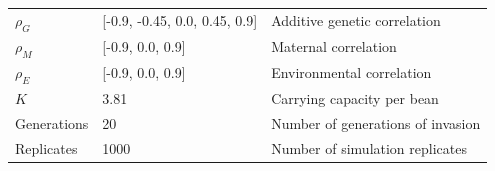 \documentclass[11pt]{article}
\begin{document}
\begin{table}[h]
\begin{tabularx}{0.95\linewidth}{llX}
$\rho_{G}$   & [-0.9, -0.45, 0.0, 0.45, 0.9]        & Additive genetic correlation          \\
$\rho_{M}$   & [-0.9, 0.0, 0.9]        & Maternal correlation          \\
$\rho_{E}$   & [-0.9, 0.0, 0.9]       & Environmental correlation             \\
$K$          & 3.81                                   & Carrying capacity per bean                          \\
Generations  & 20                                     & Number of generations of invasion                 \\
Replicates   & 1000                                   & Number of simulation replicates                   \\ \bottomrule
\end{tabularx}
\end{table}

\end{document}
